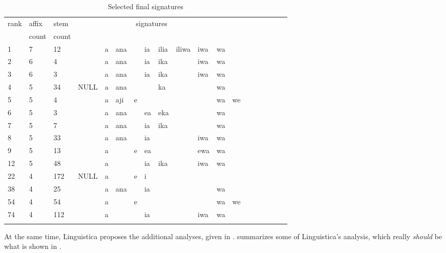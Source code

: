 \documentclass[output=paper,colorlinks,citecolor=brown]{langscibook}
\begin{document}
\begin{table}
\begin{tabular}{lllllllllllllllllll}\lsptoprule
rank& affix & stem   & \multicolumn{9}{c}{signatures} \\ 
 &   count & count & \\ \midrule
1 & 7 & 12 &     & a & ana && ia & ilia & iliwa & iwa & wa   \\
2 & 6&   4  &     & a & ana && ia & ika & & iwa &wa \\
3 & 6& 3  &     & a & ana && ia &ika  & & iwa& wa \\
4 & 5 & 34 & NULL& a & ana && & ka &     & &   wa \\
5 & 5 & 4  &     & a & aji & e & & & && wa & we \\
6 & 5 & 3 &      & a & ana && ea & eka &&& wa \\
7 & 5 & 7 &      & a & ana && ia & 	ika &&& wa \\
8 & 5 & 33 &     & a  & ana &&ia &&& iwa & wa  \\
9 & 5 & 13 &     & a  && e & ea &&& ewa & wa \\ 
12 &5 & 48 & &a &&&ia &ika &&iwa &wa \\
22 & 4 &172 & NULL & a&& e& i \\
38 & 4 &25 &&    a & ana&&  ia&&&&  wa \\
54 & 4 & 54 & & a &&e &&&&&wa & we \\
74 & 4 &  112 && a&&& ia&&& iwa& wa \\
  \lspbottomrule
\end{tabular}
\caption{Selected final signatures}
\label{final-sigs-2}
\end{table}



At the same time, Linguistica proposes the additional analyses, given in .  summarizes some of Linguistica's 
analysis, which really {\em should} be what is shown in .
\end{document}
